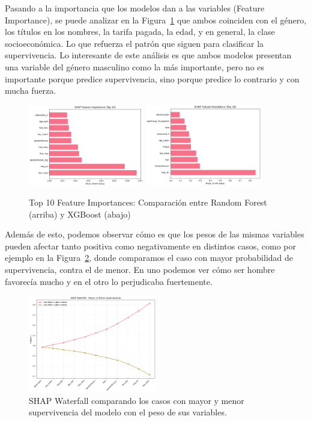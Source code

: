 \documentclass[conference]{IEEEtran}
\begin{document}
Pasando a la importancia que los modelos dan a las variables (Feature Importance), se puede analizar en la Figura~\ref{fig:feature_importance_comparison} que ambos coinciden con el género, los títulos en los nombres, la tarifa pagada, la edad, y en general, la clase socioeconómica. Lo que refuerza el patrón que siguen para clasificar la supervivencia. Lo interesante de este análisis es que ambos modelos presentan una variable del género masculino como la más importante, pero no es importante porque predice supervivencia, sino porque predice lo contrario y con mucha fuerza.

\begin{figure}[htbp]
\centering
\includegraphics[width=0.45\textwidth]{figures/feature_imp_rf.png}
\includegraphics[width=0.45\textwidth]{figures/feature_imp_xg.png}
\caption{Top 10 Feature Importances: Comparación entre Random Forest (arriba) y XGBoost (abajo)}
\label{fig:feature_importance_comparison}
\end{figure}

Además de esto, podemos observar cómo es que los pesos de las mismas variables pueden afectar tanto positiva como negativamente en distintos casos, como por ejemplo en la Figura~\ref{fig:waterfall}, donde comparamos el caso con mayor probabilidad de supervivencia, contra el de menor. En uno podemos ver cómo ser hombre favorecía mucho y en el otro lo perjudicaba fuertemente.

\begin{figure}[htbp]
\centering
\includegraphics[width=0.5\textwidth]{figures/waterfall.png}
\caption{SHAP Waterfall comparando los casos con mayor y menor supervivencia del modelo con el peso de sus variables.}
\label{fig:waterfall}
\end{figure}
\end{document}
